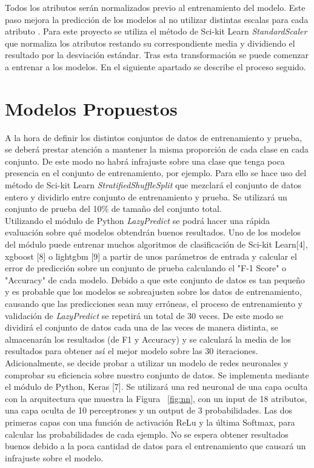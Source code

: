 \documentclass{esannV2}
\begin{document}
Todos los atributos serán normalizados previo al entrenamiento del modelo. Este paso mejora la predicción de los modelos al no utilizar distintas escalas para cada atributo . Para este proyecto se utiliza el método de Sci-kit Learn  \textit{StandardScaler} que normaliza los atributos restando su correspondiente media y dividiendo el resultado por la desviación estándar. Tras esta transformación se puede comenzar a entrenar a los modelos. En el siguiente apartado se describe el proceso seguido.

\section{Modelos Propuestos}

A la hora de definir los distintos conjuntos de datos de entrenamiento y prueba, se deberá prestar atención a mantener la misma proporción de cada clase en cada conjunto. De este modo no habrá infrajuste sobre una clase que tenga poca presencia en el conjunto de entrenamiento, por ejemplo. Para ello se hace uso del método de Sci-kit Learn \textit{StratifiedShuffleSplit} que mezclará el conjunto de datos entero y dividirlo entre conjunto de entrenamiento y prueba. Se utilizará un conjunto de prueba del 10\% de tamaño del conjunto total.\\

Utilizando el módulo de  Python \textit{LazyPredict} se podrá hacer una rápida evaluación sobre qué modelos obtendrán buenos resultados. Uno de los modelos del módulo puede entrenar muchos algoritmos de clasificación de Sci-kit Learn[4], xgboost [8] o lightgbm [9] a partir de unos parámetros de entrada y calcular el error de predicción sobre un conjunto de prueba calculando el "F-1 Score" o "Accuracy" de cada modelo. 
Debido a que este conjunto de datos es tan pequeño y es probable que los modelos se sobreajusten sobre los datos de entrenamiento, causando que las predicciones sean muy erróneas, el proceso de entrenamiento y validación de   \textit{LazyPredict}  se repetirá un total de 30 veces. De este modo se dividirá el conjunto de datos cada una de las veces de manera distinta, se almacenarán los resultados (de F1 y Accuracy) y se calculará la media de los resultados para obtener así el mejor modelo sobre las 30 iteraciones. \\ 

Adicionalmente, se decide probar a utilizar un modelo de redes neuronales y comprobar su eficiencia sobre nuestro conjunto de datos. Se implementa mediante el módulo de Python, Keras [7]. Se utilizará una red neuronal de una capa oculta con la arquitectura que muestra la Figura ~\ref{fig:nn}, con un input de 18 atributos, una capa oculta de 10 perceptrones y un output de 3 probabilidades. Las dos primeras capas con una función de activación ReLu y la última Softmax, para calcular las probabilidades de cada ejemplo.  No se espera obtener resultados buenos debido a la poca cantidad de datos para el entrenamiento que causará un infrajuste sobre el modelo.\\
\end{document}

